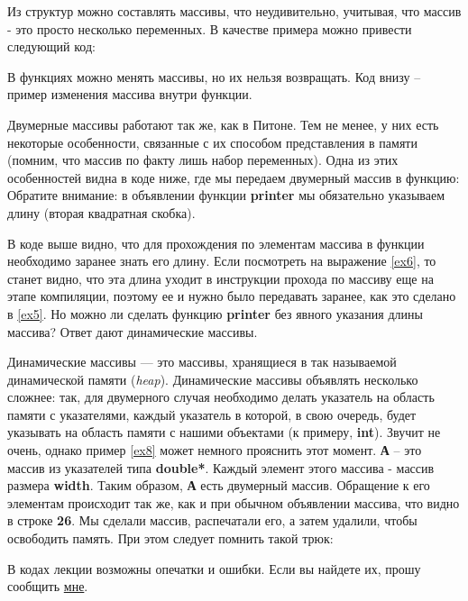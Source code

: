 \begin{lecture}[\lectureSubject]
\begin{lecSection}[Структуры в C++]
		Из структур можно составлять массивы, что неудивительно, учитывая, что массив - это просто несколько переменных. В качестве примера можно привести следующий код: \newpage
	\end{lecSection}
	\begin{lecSection}
		В функциях можно менять массивы, но их нельзя возвращать. Код внизу -- пример изменения массива внутри функции. \newpage
	\end{lecSection}
	\begin{lecSection} 
		Двумерные массивы работают так же, как в Питоне. Тем не менее, у них есть некоторые особенности, связанные с их способом представления в памяти (помним, что массив по факту лишь набор переменных). Одна из этих особенностей видна в коде ниже, где мы передаем двумерный массив в функцию:
		Обратите внимание: в объявлении функции \textbf{printer} мы обязательно указываем длину (вторая квадратная скобка).
	\end{lecSection}
	\begin{lecSection}
		В коде выше видно, что для прохождения по элементам массива в функции  необходимо заранее знать его длину. Если посмотреть на выражение \ref{ex6}, то станет видно, что эта длина уходит в инструкции прохода по массиву еще на этапе компиляции, поэтому ее и нужно было передавать заранее, как это сделано в \ref{ex5}. Но можно ли сделать функцию \textbf{printer} без явного указания длины массива? Ответ дают динамические массивы.
	\end{lecSection}
	\begin{lecSection}
		Динамические массивы --- это массивы, хранящиеся в так называемой динамической памяти (\textit{heap}). Динамические массивы объявлять несколько сложнее: так, для двумерного случая необходимо делать указатель на область памяти с указателями, каждый указатель в которой, в свою очередь, будет указывать на область памяти с нашими объектами (к примеру, \textbf{int}). Звучит не очень, однако пример \ref{ex8} может немного прояснить этот момент.
		\textbf{А} -- это массив из указателей типа \textbf{double*}. Каждый элемент этого массива - массив размера \textbf{width}. Таким образом, \textbf{А} есть двумерный массив. Обращение к его элементам происходит так же, как и при обычном объявлении массива, что видно в строке \textbf{26}.
		Мы сделали массив, распечатали его, а затем удалили, чтобы освободить память. При этом следует помнить такой трюк:
	\end{lecSection}
	\begin{center}
		\tiny{В кодах лекции возможны опечатки и ошибки. Если вы найдете их, прошу сообщить \href{http://vk.com/alekseik1}{мне}.}
	\end{center}
\end{lecture}

